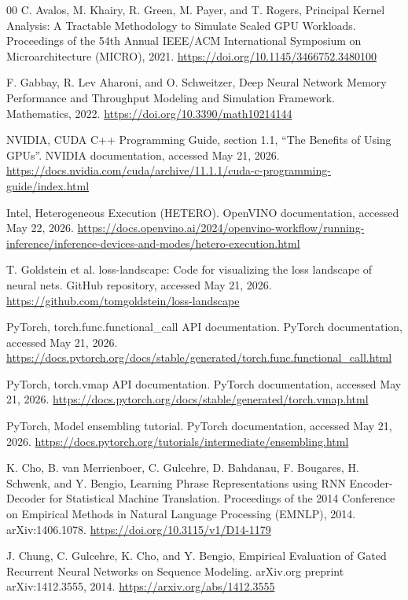 \documentclass[conference]{IEEEtran}
\begin{document}
\begin{thebibliography}{00}
C. Avalos, M. Khairy, R. Green, M. Payer, and T. Rogers,
Principal Kernel Analysis: A Tractable Methodology to Simulate
Scaled GPU Workloads. Proceedings of the 54th Annual IEEE/ACM
International Symposium on Microarchitecture (MICRO), 2021.
\url{https://doi.org/10.1145/3466752.3480100}

F. Gabbay, R. Lev Aharoni, and O. Schweitzer, Deep Neural Network
Memory Performance and Throughput Modeling and Simulation Framework.
Mathematics, 2022. \url{https://doi.org/10.3390/math10214144}

NVIDIA, CUDA C++ Programming Guide, section 1.1, ``The Benefits
of Using GPUs''. NVIDIA documentation, accessed May 21, 2026.
\url{https://docs.nvidia.com/cuda/archive/11.1.1/cuda-c-programming-guide/index.html}

Intel, Heterogeneous Execution (HETERO). OpenVINO documentation,
accessed May 22, 2026.
\url{https://docs.openvino.ai/2024/openvino-workflow/running-inference/inference-devices-and-modes/hetero-execution.html}

T. Goldstein et al. loss-landscape: Code for visualizing the loss
landscape of neural nets. GitHub repository, accessed May 21, 2026.
\url{https://github.com/tomgoldstein/loss-landscape}

PyTorch, torch.func.functional\_call API documentation. PyTorch
documentation, accessed May 21, 2026.
\url{https://docs.pytorch.org/docs/stable/generated/torch.func.functional_call.html}

PyTorch, torch.vmap API documentation. PyTorch documentation,
accessed May 21, 2026.
\url{https://docs.pytorch.org/docs/stable/generated/torch.vmap.html}

PyTorch, Model ensembling tutorial. PyTorch documentation,
accessed May 21, 2026.
\url{https://docs.pytorch.org/tutorials/intermediate/ensembling.html}

K. Cho, B. van Merrienboer, C. Gulcehre, D. Bahdanau, F. Bougares, H.
Schwenk, and Y. Bengio, Learning Phrase Representations using RNN
Encoder-Decoder for Statistical Machine Translation. Proceedings of
the 2014 Conference on Empirical Methods in Natural Language Processing
(EMNLP), 2014. arXiv:1406.1078.
\url{https://doi.org/10.3115/v1/D14-1179}

J. Chung, C. Gulcehre, K. Cho, and Y. Bengio, Empirical
Evaluation of Gated Recurrent Neural Networks on Sequence Modeling.
arXiv.org preprint arXiv:1412.3555, 2014.
\url{https://arxiv.org/abs/1412.3555}


\end{thebibliography}
\end{document}

